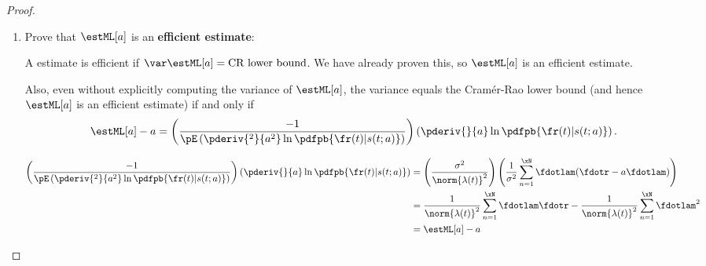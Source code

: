 \begin{proof}
\begin{enumerate}
\item Prove that $\estML[a]$ is an {\bf efficient estimate}:

A estimate is efficient if
$\var\estML[a]=\mbox{CR lower bound}$.
We have already proven this, so $\estML[a]$ is an efficient estimate.

Also, even without explicitly computing the variance of $\estML[a]$,
the variance equals the Cram\'er-Rao lower bound
(and hence $\estML[a]$ is an efficient estimate)
if and only if
\[ \estML[a] -  a =
   \left( \frac{-1}{\pE\left(
              \pderiv{^2}{ a^2} \ln \pdfpb{\fr(t)|s(t; a)}
           \right)} \right)
   \left(\pderiv{}{ a} \ln \pdfpb{\fr(t)|s(t; a)} \right).
\]

\begin{align*}
   \left( \frac{-1}{\pE\left(
              \pderiv{^2}{ a^2} \ln \pdfpb{\fr(t)|s(t; a)}
           \right)} \right)
   \left(\pderiv{}{ a} \ln \pdfpb{\fr(t)|s(t; a)} \right)
     &= \left(\frac{\sigma^2}{\norm{\lambda(t)}^2}\right)
         \left(
           \frac{1}{\sigma^2} \sum_{n=1}^\xN \fdotlam( \fdotr - a \fdotlam)
         \right)
   \\&= \frac{1}{\norm{\lambda(t)}^2} \sum_{n=1}^\xN \fdotlam \fdotr -
         \frac{1}{\norm{\lambda(t)}^2} \sum_{n=1}^\xN \fdotlam^2
   \\&= \estML[a] - a
\end{align*}


\end{enumerate}
\end{proof}


